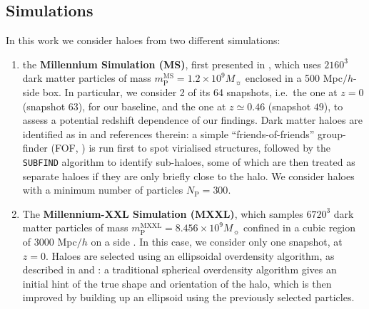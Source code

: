 \documentclass[a4paper,fleqn,usenatbib]{mnras}
\begin{document}
\subsection{Simulations}
\label{subsec:sim}
In this work we consider haloes from two different simulations: 
\begin{enumerate}
\item the \textbf{Millennium Simulation (MS)}, first presented in \citet{Springeletal2005}, which uses $2160^3$ dark matter particles of mass $m_{\mathrm{P}}^{\mathrm{MS}} =1.2 \times 10^9 M_{\sun}$ enclosed in a 500 Mpc$/h$-side box.
In particular, we consider 2 of its 64 snapshots, i.e.\ the one at $z = 0$ (snapshot $63$), for our baseline, and the one at $z \simeq 0.46$ (snapshot $49$), to assess a potential redshift dependence of our findings. Dark matter haloes are identified as in \citet{Joachimietal2013a} and references therein: a simple ``friends-of-friends'' group-finder (FOF, \citealt{Davisetal1985}) is run first to spot virialised structures, followed by the \texttt{SUBFIND} algorithm \citep{Springeletal2001, Springeletal2005} to identify sub-haloes, some of which are then treated as separate haloes if they are only briefly close to the halo. We consider haloes with a minimum number of particles $N_{\mathrm{P}} = 300$.
\item The \textbf{Millennium-XXL Simulation (MXXL)}, which samples $6720^3$ dark matter particles of mass $m_{\mathrm{P}}^{\mathrm{MXXL}} = 8.456 \times 10^9 M_{\sun}$ confined in a cubic region of $3000$ Mpc$/h$ on a side \citep{Anguloetal2012}. In this case, we consider only one snapshot, at $z = 0$. Haloes are selected using an ellipsoidal overdensity algorithm, as described in \citet{Despalietal2013} and \citet{Bonamigoetal2015}: a traditional spherical overdensity algorithm \citep{LaceyCole1994} gives an initial hint of the true shape and orientation of the halo, which is then improved by building up an ellipsoid using the previously selected particles. %
\end{enumerate} 
\end{document}
